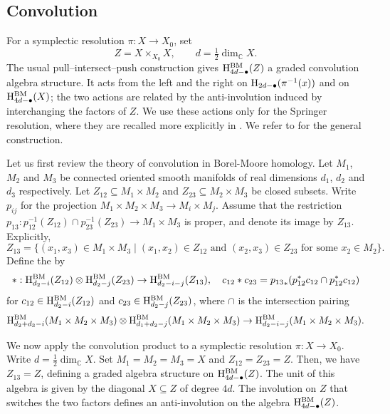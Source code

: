 \subsection{Convolution}
\label{sec:steinberg}

For a symplectic resolution $\pi:X\to X_0$, set
\[
  Z=X\times_{X_0}X,
  \qquad d=\tfrac12\dim_\mathbb{C}X.
\]
The usual pull--intersect--push construction gives
$\mathrm{H}^\mathrm{BM}_{4d-\bullet}(Z)$ a graded convolution algebra structure. It acts
from the left and the right on $\mathrm{H}_{2d-\bullet}(\pi^{-1}(x))$ and on
$\mathrm{H}^\mathrm{BM}_{4d-\bullet}(X)$; the two actions are related by the
anti-involution induced by interchanging the factors of $Z$. We use
these actions only for the Springer resolution, where they are recalled
more explicitly in . We refer to
\cite[Section 8.5]{chriss1997representation} for the general
construction.

\iffalse

Let us first review the theory of convolution in Borel-Moore homology. Let $M_1$, $M_2$ and $M_3$ be connected oriented smooth manifolds of real dimensions $d_1$, $d_2$ and $d_3$ respectively. Let $Z_{12} \subseteq M_1 \times M_2$ and $Z_{23} \subseteq M_2 \times M_3$ be closed subsets. Write $p_{ij}$ for the projection $M_1 \times M_2 \times M_3 \to M_i \times M_j$. Assume that the restriction $p_{13} : p_{12}^{-1}(Z_{12}) \cap p_{23}^{-1}(Z_{23}) \to M_1 \times M_3$ is proper, and denote its image by $Z_{13}$. Explicitly,
\begin{equation*}
    Z_{13} = \{ (x_1, x_3) \in M_1 \times M_3 \mid (x_1, x_2) \in Z_{12} \text{ and } (x_2, x_3) \in Z_{23} \text{ for some } x_2 \in M_2 \}.
\end{equation*}
Define the  by
\begin{equation*}
    {*} : \mathrm{H}^\mathrm{BM}_{d_2-i}(Z_{12}) \otimes \mathrm{H}^\mathrm{BM}_{d_2-j}(Z_{23}) \to \mathrm{H}^\mathrm{BM}_{d_2-i-j}(Z_{13}), \quad c_{12} * c_{23} = {p_{13}}_*(p_{12}^*c_{12} \cap p_{12}^*c_{12})
\end{equation*}
for $c_{12} \in \mathrm{H}^\mathrm{BM}_{d_2-i}(Z_{12})$ and $c_{23} \in \mathrm{H}^\mathrm{BM}_{d_2-j}(Z_{23})$, where ${\cap}$ is the intersection pairing
\begin{equation*}
    \mathrm{H}^\mathrm{BM}_{d_2+d_3-i}(M_1 \times M_2 \times M_3) \otimes \mathrm{H}^\mathrm{BM}_{d_1+d_2-j}(M_1 \times M_2 \times M_3) \to \mathrm{H}^\mathrm{BM}_{d_2-i-j}(M_1 \times M_2 \times M_3).
\end{equation*}

We now apply the convolution product to a symplectic resolution $\pi : X \to X_0$. Write $d = \frac{1}{2}\dim_{\mathbb{C}} X$. Set $M_1 = M_2 = M_3 = X$ and $Z_{12} = Z_{23} = Z$. Then, we have $Z_{13} = Z$, defining a graded algebra structure on $\mathrm{H}^\mathrm{BM}_{4d-\bullet}(Z)$. The unit of this algebra is given by the diagonal $X \subseteq Z$ of degree $4d$. The involution on $Z$ that switches the two factors defines an anti-involution on the algebra $\mathrm{H}^\mathrm{BM}_{4d-\bullet}(Z)$.


